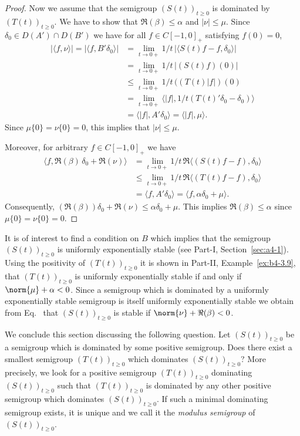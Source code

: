 \begin{proof}
Now we assume that the semigroup $(S(t))_{t \geq 0}$ is dominated by $(T(t))_{t \geq 0}$.
We have to show that $\Re(\beta) \leq \alpha$ and $|\nu| \leq \mu$.
Since $\delta_{0} \in D(A') \cap D(B')$ we have for all $f \in C[-1,0]_{+}$ satisfying $f(0) = 0$,
\begin{align*}
|\langle f,\nu\rangle| = |\langle f,B'\delta_{0}\rangle| &= \lim_{t \to 0+} 1/t \, |\langle S(t)f - f , \delta_{0}\rangle|\\
%
&= \lim_{t \to 0+} 1/t \, |(S(t)f)(0)|  \\
&\leq \lim_{t \to 0+} 1/t \, ((T(t)|f|)(0) \\
&= \lim_{t \to 0+} \langle|f|,1/t(T(t)'\delta_{0} - \delta_{0})\rangle \\
&= \langle|f|,A'\delta_{0}\rangle = \langle|f|,\mu\rangle.
\end{align*}
Since $\mu\{0\} = \nu\{0\} = 0$, this implies that $|\nu| \leq \mu$.

Moreover, for arbitrary $f \in C[-1,0]_{+}$ we have
\begin{align*}
\langle f,\Re(\beta) \, \delta_{0} + \Re(\nu)\rangle &= \lim_{t \to 0+} 1/t \, \Re\langle(S(t)f - f),\delta_{0}\rangle\\
&\leq \lim_{t \to 0+} 1/t \, \Re\langle(T(t)f - f),\delta_{0}\rangle \\
&= \langle f,A'\delta_{0}\rangle = \langle f,\alpha\delta_{0} + \mu\rangle.
\end{align*}
Consequently, $(\Re(\beta))\delta_{0} + \Re(\nu) \leq \alpha\delta_{0} + \mu$.
This implies $\Re(\beta) \leq \alpha$ since $\mu \{0\}  = \nu\{0\}  = 0$.
\end{proof}
\begin{remark*}
It is of interest to find a condition on $B$ which implies that the semigroup $(S(t))_{t \geq 0}$ is uniformly exponentially stable (see Part-I, Section~\ref{sec:a4-1}).
Using the positivity of\/ $(T(t))_{t \geq 0}$ it is shown in Part-II, Example~\ref{ex:b4-3.9}, that
$(T(t))_{t \geq 0}$ is uniformly exponentially stable if and only if\/ $\norm{\mu} + \alpha < 0$.
Since a semigroup which is dominated by a uniformly exponentially stable semigroup is itself uniformly exponentially stable we obtain from Eq.~ that $(S(t))_{t \geq 0}$ is stable if\/ $\norm{\nu} + \Re(\beta) < 0$.
\end{remark*}
We conclude this section discussing the following question.
Let $(S(t))_{t \geq 0}$ be a semigroup which is dominated by some positive semigroup.
Does there exist a smallest semigroup $(T(t))_{t \geq 0}$ which dominates $(S(t))_{t \geq 0}$?
More precisely, we look for a positive semigroup $(T(t))_{t \geq 0}$ dominating $(S(t))_{t \geq 0}$ such that $(T(t))_{t \geq 0}$ is dominated
by any other positive semigroup which dominates $(S(t))_{t \geq 0}$.
If such a minimal dominating semigroup exists, it is unique and we call it the
\emph{modulus semigroup} of\/ $(S(t))_{t \geq 0}$.

